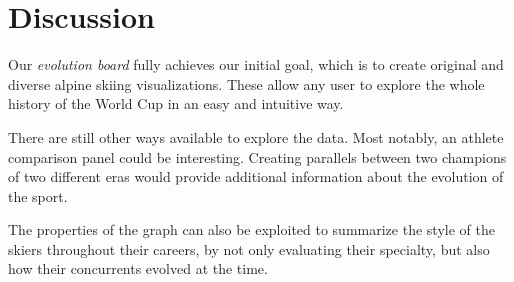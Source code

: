 \section{Discussion}

Our \textit{evolution board} fully achieves our initial goal, which is to create original and diverse alpine skiing visualizations.
These allow any user to explore the whole history of the World Cup in an easy and intuitive way.

There are still other ways available to explore the data.
Most notably, an athlete comparison panel could be interesting.
Creating parallels between two champions of two different eras would provide additional information about the evolution of the sport.

The properties of the graph can also be exploited to summarize the style of the skiers throughout their careers, by not only evaluating their specialty, but also how their concurrents evolved at the time.
